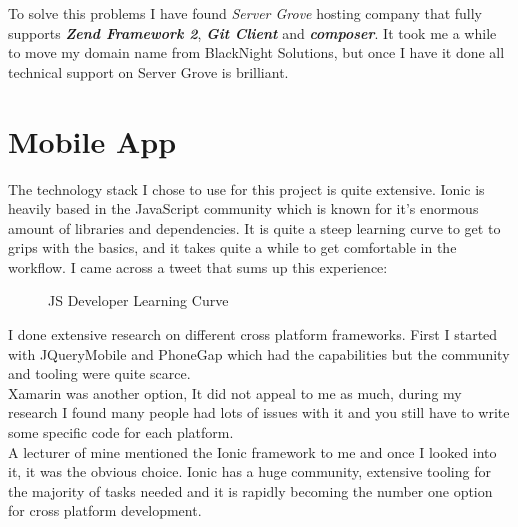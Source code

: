 To solve this problems I have found \textit{Server Grove} hosting company that fully supports \textbf{\textit{Zend Framework 2}}, \textbf{\textit{Git Client}} and  \textbf{\textit{composer}}. It took me a while to move my domain name from BlackNight Solutions, but once I have it done all technical support on Server Grove is brilliant.


\pagebreak
  \section{Mobile App} %
The technology stack I chose to use for this project is quite extensive.  
Ionic is heavily based in the JavaScript community which is known for it's enormous amount of libraries and dependencies.
It is quite a steep learning curve to get to grips with the basics, and it takes quite a while to get comfortable in the workflow.
I came across a tweet that sums up this experience:
\begin{figure}[H] 
	\caption{JS Developer Learning Curve}
	\label{fig:speciation}
\end{figure}


I  done extensive research on different cross platform frameworks.
First I started with JQueryMobile and PhoneGap which had the capabilities but the community and tooling were quite scarce. 
\\ 

Xamarin was another option, It did not appeal to me as much, during my research I found many people had lots of issues with it and you still have to write some specific code for each platform.
\\ 

A lecturer of mine mentioned the Ionic framework to me and once I looked into it, it was the obvious choice.
Ionic has a huge community, extensive tooling for the majority of tasks needed and it is rapidly becoming the number one option for cross platform development.
\\

